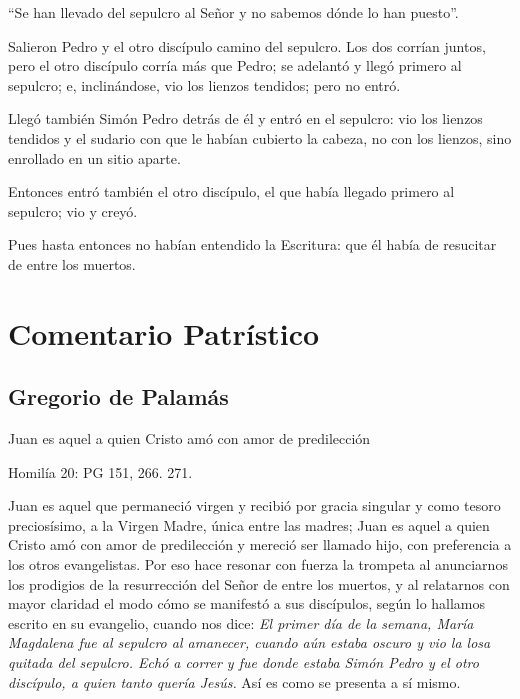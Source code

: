 			\begin{readtalk}“Se han llevado del sepulcro al Señor y no sabemos dónde lo han puesto”. \end{readtalk}
			
			\begin{readbody}Salieron Pedro y el otro discípulo camino del sepulcro. Los dos corrían juntos, pero el otro discípulo corría más que Pedro; se adelantó y llegó primero al sepulcro; e, inclinándose, vio los lienzos tendidos; pero no entró. \end{readbody}
			
			\begin{readbody}Llegó también Simón Pedro detrás de él y entró en el sepulcro: vio los lienzos tendidos y el sudario con que le habían cubierto la cabeza, no con los lienzos, sino enrollado en un sitio aparte. \end{readbody}
			
			\begin{readbody}Entonces entró también el otro discípulo, el que había llegado primero al sepulcro; vio y creyó. \end{readbody}
			
			\begin{readbody}Pues hasta entonces no habían entendido la Escritura: que él había de resucitar de entre los muertos.\end{readbody}
			
			\section{Comentario Patrístico}
			
			\subsection{ Gregorio de Palamás}
			
			\begin{patertheme}Juan es aquel a quien Cristo amó con amor de predilección\end{patertheme}
			
			\begin{patersource}Homilía 20: PG 151, 266. 271.\end{patersource}
			
			\begin{body}Juan es aquel que permaneció virgen y recibió por gracia singular y como tesoro preciosísimo, a la Virgen Madre, única entre las madres; Juan es aquel a quien Cristo amó con amor de predilección y mereció ser llamado hijo, con preferencia a los otros evangelistas. Por eso hace resonar con fuerza la trompeta al anunciarnos los prodigios de la resurrección del Señor de entre los muertos, y al relatarnos con mayor claridad el modo cómo se manifestó a sus discípulos, según lo hallamos escrito en su evangelio, cuando nos dice: \textit{El primer día de la semana, María Magdalena fue al sepulcro al amanecer, cuando aún estaba oscuro y vio la losa quitada del sepulcro. Echó a correr y fue donde estaba Simón Pedro y el otro discípulo, a quien tanto quería Jesús. }Así es como se presenta a sí mismo.\end{body}
			
